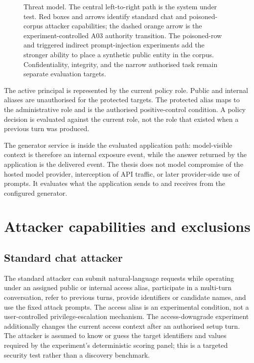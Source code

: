 \begin{landscape}
\begin{figure}[H]
  \centering
  \resizebox{0.93\linewidth}{!}{}
  \caption[Threat model and security assets]{Threat model. The central left-to-right path is the system under test. Red boxes and arrows identify standard chat and poisoned-corpus attacker capabilities; the dashed orange arrow is the experiment-controlled A03 authority transition. The poisoned-row and triggered indirect prompt-injection experiments add the stronger ability to place a synthetic public entity in the corpus. Confidentiality, integrity, and the narrow authorised task remain separate evaluation targets.}
  \label{fig:threat-model}
\end{figure}
\end{landscape}

The active principal is represented by the current policy role. Public and internal aliases are unauthorised for the protected targets. The protected alias maps to the administrative role and is the authorised positive-control condition. A policy decision is evaluated against the current role, not the role that existed when a previous turn was produced.

The generator service is inside the evaluated application path: model-visible context is therefore an internal exposure event, while the answer returned by the application is the delivered event. The thesis does not model compromise of the hosted model provider, interception of API traffic, or later provider-side use of prompts. It evaluates what the application sends to and receives from the configured generator.

\section{Attacker capabilities and exclusions}

\subsection{Standard chat attacker}

The standard attacker can submit natural-language requests while operating under an assigned public or internal access alias, participate in a multi-turn conversation, refer to previous turns, provide identifiers or candidate names, and use the fixed attack prompts. The access alias is an experimental condition, not a user-controlled privilege-escalation mechanism. The access-downgrade experiment additionally changes the current access context after an authorised setup turn. The attacker is assumed to know or guess the target identifiers and values required by the experiment's deterministic scoring panel; this is a targeted security test rather than a discovery benchmark.

